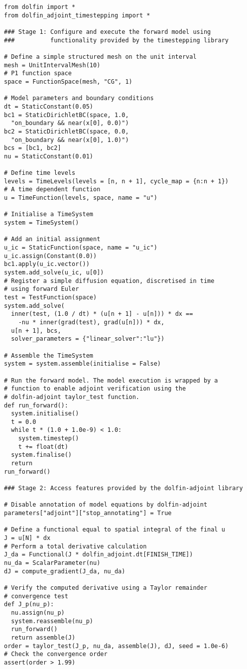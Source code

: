 \documentclass[a4paper]{book}
\begin{document}
\begin{lstlisting}
from dolfin import *
from dolfin_adjoint_timestepping import *

### Stage 1: Configure and execute the forward model using
###          functionality provided by the timestepping library

# Define a simple structured mesh on the unit interval
mesh = UnitIntervalMesh(10)
# P1 function space
space = FunctionSpace(mesh, "CG", 1)

# Model parameters and boundary conditions
dt = StaticConstant(0.05)
bc1 = StaticDirichletBC(space, 1.0,
  "on_boundary && near(x[0], 0.0)")
bc2 = StaticDirichletBC(space, 0.0,
  "on_boundary && near(x[0], 1.0)")
bcs = [bc1, bc2]
nu = StaticConstant(0.01)

# Define time levels
levels = TimeLevels(levels = [n, n + 1], cycle_map = {n:n + 1})
# A time dependent function
u = TimeFunction(levels, space, name = "u")

# Initialise a TimeSystem
system = TimeSystem()

# Add an initial assignment
u_ic = StaticFunction(space, name = "u_ic")
u_ic.assign(Constant(0.0))
bc1.apply(u_ic.vector())
system.add_solve(u_ic, u[0])
# Register a simple diffusion equation, discretised in time
# using forward Euler
test = TestFunction(space)
system.add_solve(
  inner(test, (1.0 / dt) * (u[n + 1] - u[n])) * dx ==
    -nu * inner(grad(test), grad(u[n])) * dx,
  u[n + 1], bcs,
  solver_parameters = {"linear_solver":"lu"})

# Assemble the TimeSystem
system = system.assemble(initialise = False)

# Run the forward model. The model execution is wrapped by a
# function to enable adjoint verification using the
# dolfin-adjoint taylor_test function.
def run_forward():
  system.initialise()
  t = 0.0
  while t * (1.0 + 1.0e-9) < 1.0:
    system.timestep()
    t += float(dt)
  system.finalise()
  return
run_forward()

### Stage 2: Access features provided by the dolfin-adjoint library

# Disable annotation of model equations by dolfin-adjoint
parameters["adjoint"]["stop_annotating"] = True

# Define a functional equal to spatial integral of the final u
J = u[N] * dx
# Perform a total derivative calculation
J_da = Functional(J * dolfin_adjoint.dt[FINISH_TIME])
nu_da = ScalarParameter(nu)
dJ = compute_gradient(J_da, nu_da)

# Verify the computed derivative using a Taylor remainder
# convergence test  
def J_p(nu_p):
  nu.assign(nu_p)
  system.reassemble(nu_p)
  run_forward()
  return assemble(J)
order = taylor_test(J_p, nu_da, assemble(J), dJ, seed = 1.0e-6)
# Check the convergence order
assert(order > 1.99)
\end{lstlisting}
\end{document}
